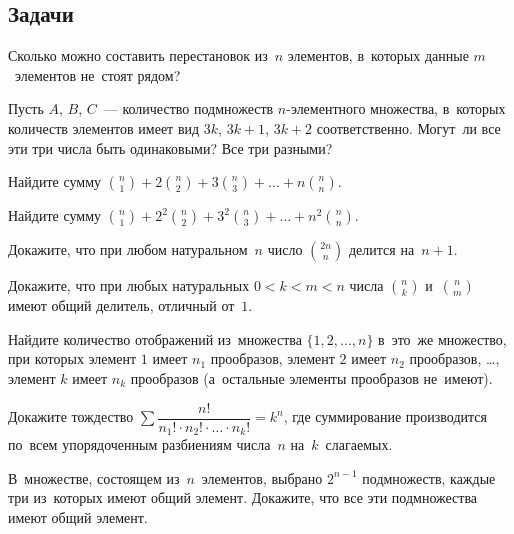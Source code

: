 \subsection*{Задачи}

\begin{problems}

\item
Сколько можно составить перестановок из~$n$ элементов, в~которых данные
$m$~элементов не~стоят рядом?

\item
Пусть $A$, $B$, $C$~--- количество подмножеств $n$-элементного множества,
в~которых количеств элементов имеет вид $3k$, $3k+1$, $3k+2$ соответственно.
Могут~ли все эти три числа быть одинаковыми?
Все три разными?

\item
Найдите сумму
\(
    \binom{n}{1} + 2 \binom{n}{2} + 3 \binom{n}{3}
    + \ldots +
    n \binom{n}{n}
\).

\item
Найдите сумму
\(
    \binom{n}{1} + 2^{2} \binom{n}{2} + 3^{2} \binom{n}{3}
    + \ldots +
    n^{2} \binom{n}{n}
\).

\item
Докажите, что при любом натуральном~$n$ число $\binom{2n}{n}$
делится на~$n + 1.$

\item
Докажите, что при любых натуральных $0 < k < m < n$ числа
$\binom{n}{k}$ и~$\binom{n}{m}$ имеют общий делитель, отличный от~$1$.

\item
Найдите количество отображений из~множества $\{1, 2, \ldots, n\}$ в~это~же
множество, при которых
элемент $1$ имеет $n_{1}$ прообразов,
элемент $2$ имеет $n_{2}$ прообразов, \ldots,
элемент $k$ имеет $n_{k}$ прообразов
(а~остальные элементы прообразов не~имеют).

\item
Докажите тождество
\(
    \sum
        \dfrac{n!}{n_{1}! \cdot n_{2}! \cdot \ldots \cdot n_{k}!}
=
    k^{n}
\),
где суммирование производится по~всем упорядоченным разбиениям числа~$n$
на~$k$~слагаемых.

\item
В~множестве, состоящем из~$n$~элементов, выбрано $2^{n-1}$ подмножеств, каждые
три из~которых имеют общий элемент.
Докажите, что все эти подмножества имеют общий элемент.

\end{problems}

\endgroup %

